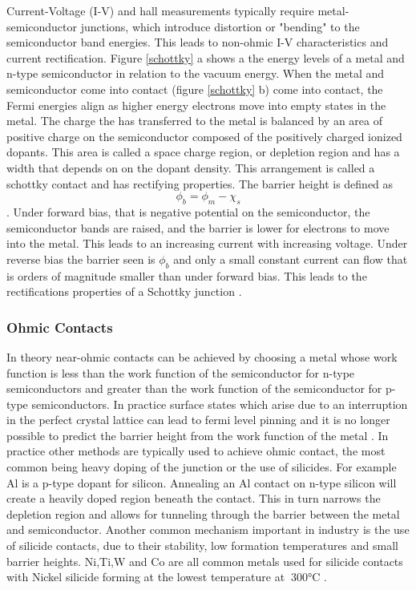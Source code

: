 Current-Voltage (I-V) and hall measurements typically require metal-semiconductor junctions, which introduce distortion or "bending" to the semiconductor band energies. This leads to non-ohmic I-V characteristics and current rectification.  Figure \ref{schottky} a shows a the energy levels of a metal and n-type semiconductor in relation to the vacuum energy. When the metal and semiconductor come into contact (figure \ref{schottky} b) come into contact, the Fermi energies align as higher energy electrons move into empty states in the metal. The charge the has transferred to the metal is balanced by an area of positive charge on the semiconductor composed of the positively charged ionized dopants. This area is called a space charge region, or depletion region and has a width that depends on on the dopant density. This arrangement is called a schottky contact and has rectifying properties. The barrier height is defined as $$\phi_b = \phi_m - \chi_s$$. Under forward bias, that is negative potential on the semiconductor, the semiconductor bands are raised, and the barrier is lower for electrons to move into the metal. This leads to an increasing current with increasing voltage. Under reverse bias the barrier seen is $\phi_b$ and only a small constant current can flow that is orders of magnitude smaller than under forward bias. This leads to the rectifications properties of a Schottky junction \cite{KasapS.O2002Poem}.

\subsubsection{Ohmic Contacts}

In theory near-ohmic contacts can be achieved by choosing a metal whose work function is less than the work function of the semiconductor for n-type semiconductors and greater than the work function of the semiconductor for p-type semiconductors. In practice surface states which arise due to an interruption in the perfect crystal lattice can lead to fermi level pinning and it is no longer possible to predict the barrier height from the work function of the metal \cite{D.K.Schroder2006MATERIALEdition}. In practice other methods are typically used to achieve ohmic contact, the most common being heavy doping of the junction or the use of silicides. For example Al is a  p-type dopant for silicon. Annealing an Al contact on n-type silicon will create a heavily doped region beneath the contact. This in turn narrows the depletion region and allows for tunneling through the barrier between the metal and semiconductor. Another common mechanism important in industry is the use of silicide contacts, due to their stability, low formation temperatures and small barrier heights. Ni,Ti,W and Co are all common metals used for silicide contacts with Nickel silicide forming at the lowest temperature at $~300\si{\celsius}$ \cite{}. 


